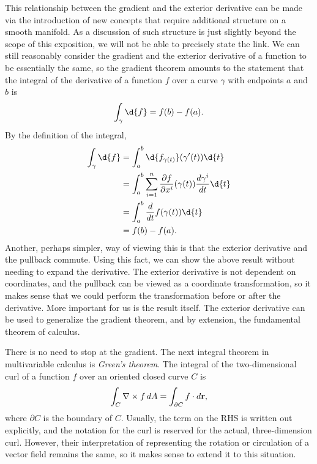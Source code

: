 \documentclass[a4paper,12pt]{article}
\begin{document}
This relationship between the gradient and the exterior derivative can be made via the introduction of new concepts that require additional structure on a smooth manifold.
As a discussion of such structure is just slightly beyond the scope of this exposition, we will not be able to precisely state the link.
We can still reasonably consider the gradient and the exterior derivative of a function to be essentially the same, so the gradient theorem amounts to the statement that the integral of the derivative of a function $f$ over a curve $\gamma$ with endpoints $a$ and $b$ is
\begin{equation*}
    \int_\gamma \d{f} = f(b) - f(a).
\end{equation*}
By the definition of the integral,
\begin{align*}
    \int_\gamma \d{f} &= \int_a^b \d{f_{\gamma(t)}}(\gamma'(t)) \d{t} \\
    &= \int_a^b \sum_{i=1}^n \frac{\partial f}{\partial x^i}(\gamma(t))\frac{d\gamma^i}{dt} \d{t} \\
    &= \int_a^b \frac{d}{dt} f(\gamma(t)) \d{t} \\
    &= f(b) - f(a).
\end{align*}
Another, perhaps simpler, way of viewing this is that the exterior derivative and the pullback commute.
Using this fact, we can show the above result without needing to expand the derivative.
The exterior derivative is not dependent on coordinates, and the pullback can be viewed as a coordinate transformation, so it makes sense that we could perform the transformation before or after the derivative.
More important for us is the result itself.
The exterior derivative can be used to generalize the gradient theorem, and by extension, the fundamental theorem of calculus.

There is no need to stop at the gradient.
The next integral theorem in multivariable calculus is \emph{Green's theorem}.
The integral of the two-dimensional curl of a function $f$ over an oriented closed curve $C$ is
\begin{equation*}
    \int_C \nabla \times f \mathop{}\!d A = \int_{\partial C} f \cdot \mathop{}\!d \mathbf{r},
\end{equation*}
where $\partial C$ is the boundary of $C$.
Usually, the term on the RHS is written out explicitly, and the notation for the curl is reserved for the actual, three-dimension curl.
However, their interpretation of representing the rotation or circulation of a vector field remains the same, so it makes sense to extend it to this situation.
\end{document}
